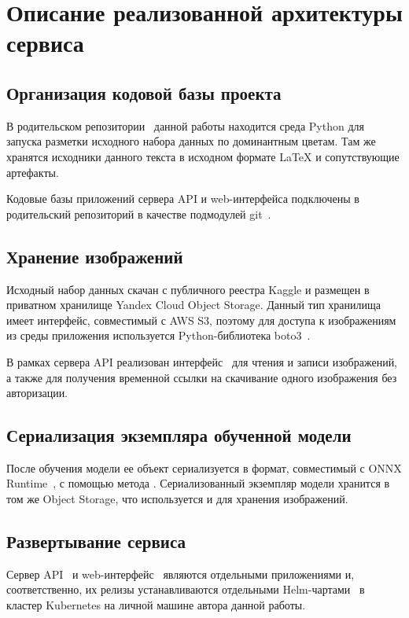 \documentclass[a4paper,12pt]{extarticle}
\begin{document}
\newpage
\section{Описание реализованной архитектуры сервиса}

\subsection{Организация кодовой базы проекта}

В родительском репозитории~\cite{gradwork} данной работы находится среда Python для запуска разметки
исходного набора данных по доминантным цветам. Там же хранятся исходники данного текста в исходном
формате LaTeX и сопутствующие артефакты.

Кодовые базы приложений сервера API и web-интерфейса подключены в родительский репозиторий в качестве
подмодулей git~\cite{submodules}.

\subsection{Хранение изображений}

Исходный набор данных скачан с публичного реестра Kaggle и размещен в приватном хранилище Yandex
Cloud Object Storage. Данный тип хранилища имеет интерфейс, совместимый с AWS S3,
поэтому для доступа к изображениям из среды приложения используется Python-библиотека
boto3~\cite{boto3}.

В рамках сервера API реализован интерфейс~\cite{coreS3} для чтения и записи изображений, а также для
получения временной ссылки на скачивание одного изображения без авторизации.

\subsection{Сериализация экземпляра обученной модели}

После обучения модели ее объект сериализуется в формат, совместимый с ONNX Runtime~\cite{ONNX}, с
помощью метода . Сериализованный экземпляр модели хранится в том же
Object Storage, что используется и для хранения изображений.

\subsection{Развертывание сервиса}

Сервер API~\cite{server} и web-интерфейс~\cite{web_UI} являются отдельными приложениями и,
соответственно, их релизы устанавливаются отдельными Helm-чартами~\cite{server_chart,web_UI_chart} в
кластер Kubernetes на личной машине автора данной работы.
\end{document}
